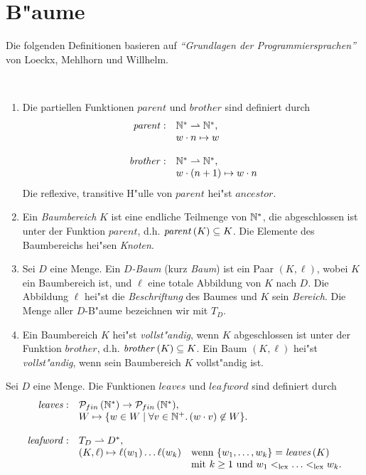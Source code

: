 \documentclass[12pt,a4paper]{article}
\begin{document}
\section{B"aume}

Die folgenden Definitionen basieren auf \emph{``Grundlagen der Programmiersprachen''} von Loeckx,
Mehlhorn und Willhelm.
\begin{definition} \
  \begin{enumerate}
  \item Die partiellen Funktionen $\mathit{parent}$ und $\mathit{brother}$ sind definiert durch
    \[\begin{array}{rl}
      \mathit{parent}: & \mathbb N^* \rightharpoonup \mathbb N^*, \\
      & w \cdot n \mapsto w \\
      \\
      \mathit{brother}: & \mathbb N^* \rightharpoonup \mathbb N^*, \\
      & w \cdot (n+1) \mapsto w \cdot n \\
    \end{array}\]
    Die reflexive, transitive H"ulle von $\mathit{parent}$ hei"st $\mathit{ancestor}$.
  \item Ein \emph{Baumbereich} $K$ ist eine endliche Teilmenge von $\mathbb N^*$, die abgeschlossen
    ist unter der Funktion $\mathit{parent}$, d.h. $\mathit{parent}\,(K) \subseteq K$. Die Elemente des
    Baumbereichs hei"sen \emph{Knoten}.
  \item Sei $D$ eine Menge. Ein \emph{$D$-Baum} (kurz \emph{Baum}) ist ein Paar $(K,\ell)$,
    wobei $K$ ein Baumbereich ist, und $\ell$ eine totale Abbildung von $K$ nach $D$. Die
    Abbildung $\ell$ hei"st die \emph{Beschriftung} des Baumes und $K$ sein \emph{Bereich}.
    Die Menge aller $D$-B"aume bezeichnen wir mit $T_D$.
  \item Ein Baumbereich $K$ hei"st \emph{vollst"andig}, wenn $K$ abgeschlossen ist unter der
    Funktion $\mathit{brother}$, d.h. $\mathit{brother}\,(K) \subseteq K$. Ein Baum $(K,\ell)$ hei"st
    \emph{vollst"andig}, wenn sein Baumbereich $K$ vollst"andig ist.
  \end{enumerate}
\end{definition}

\begin{definition}
  Sei $D$ eine Menge. Die Funktionen $\mathit{leaves}$ und $\mathit{leafword}$ sind definiert durch
  \[\begin{array}{rll}
    \mathit{leaves}: & \powersetfin{\N^*} \to \powersetfin{\N^*}, \\
    & \multicolumn{2}{l}{W \mapsto \{w \in W \mid \forall v \in \N^+.\,(w \cdot v) \not\in W\}.} \\
    \\
    \mathit{leafword}: & T_D \pto D^*, \\
    & (K,\ell) \mapsto \ell(w_1)\ldots\ell(w_k) & \text{wenn $\{w_1,\ldots,w_k\}=\leaves{K}$} \\
    && \text{mit $k \ge 1$ und $w_1 <_{\text{lex}} \ldots <_{\text{lex}} w_k$.} \\
    \end{array}\]
\end{definition}
\end{document}
